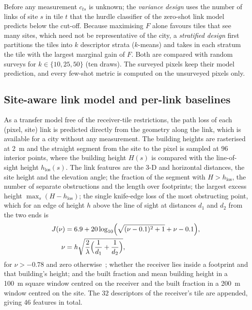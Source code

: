 \noindent Before any measurement $c_{ts}$ is unknown; the \emph{variance
design} uses the number of links of site $s$ in tile $t$ that the hurdle
classifier of the zero-shot link model predicts below the cut-off. Because
maximising $F$ alone favours tiles that see many sites, which need not be
representative of the city, a \emph{stratified design} first partitions the
tiles into $k$ descriptor strata ($k$-means) and takes in each stratum the
tile with the largest marginal gain of $F$. Both are compared with random
surveys for $k\in\{10,25,50\}$ (ten draws). The surveyed pixels keep their
model prediction, and every few-shot metric is computed on the unsurveyed
pixels only.

\subsection{Site-aware link model and per-link baselines}
\label{sec:link}

As a transfer model free of the receiver-tile restrictions, the path loss
of each (pixel, site) link is predicted directly from the geometry along the
link, which is available for a city without any measurement. The building
heights are rasterised at \SI{2}{\metre} and the straight segment from the
site to the pixel is sampled at $96$ interior points, where the building
height $H(s)$ is compared with the line-of-sight height $h_{\mathrm{los}}(s)$.
The link features are the 3-D and horizontal distances, the site height and
the elevation angle; the fraction of the segment with $H>h_{\mathrm{los}}$,
the number of separate obstructions and the length over footprints; the
largest excess height $\max_s(H-h_{\mathrm{los}})$; the single knife-edge
loss of the most obstructing point, which for an edge of height $h$ above
the line of sight at distances $d_1$ and $d_2$ from the two ends is
\begin{equation}
\begin{aligned}
J(\nu)&=6.9+20\log_{10}\Bigl(\sqrt{(\nu-0.1)^{2}+1}+\nu-0.1\Bigr),\\
\nu&=h\sqrt{\frac{2}{\lambda}\Bigl(\frac{1}{d_1}+\frac{1}{d_2}\Bigr)},
\end{aligned}
\label{eq:knife}
\end{equation}
for $\nu>-0.78$ and zero otherwise~\cite{itup526}; whether the receiver lies
inside a footprint and that building's height; and the built fraction and
mean building height in a \SI{100}{\metre} square window centred on the
receiver and the built fraction in a \SI{200}{\metre} window centred on the
site. The $32$ descriptors of the receiver's tile are appended, giving 46
features in total.

